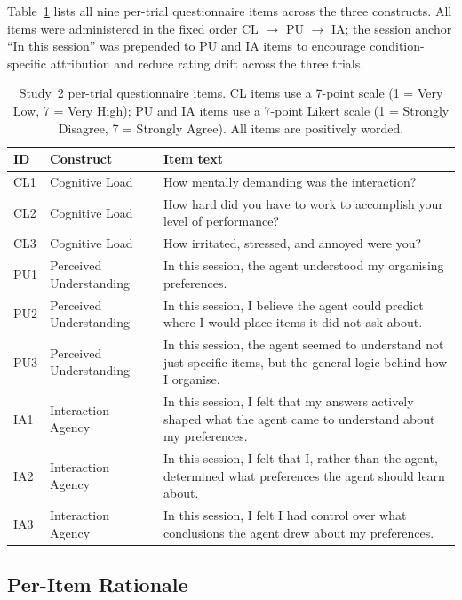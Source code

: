\documentclass[manuscript,review,anonymous]{acmart}
\begin{document}
Table~\ref{tab:questionnaire-items} lists all nine per-trial questionnaire items across the three constructs. All items were administered in the fixed order CL $\to$ PU $\to$ IA; the session anchor ``In this session'' was prepended to PU and IA items to encourage condition-specific attribution and reduce rating drift across the three trials.

\begin{table}[h]
\centering
\caption{Study~2 per-trial questionnaire items. CL items use a 7-point scale (1 = Very Low, 7 = Very High); PU and IA items use a 7-point Likert scale (1 = Strongly Disagree, 7 = Strongly Agree). All items are positively worded.}
\label{tab:questionnaire-items}
\small
\begin{tabularx}{\linewidth}{@{} l l X @{}}
\toprule
\textbf{ID} & \textbf{Construct} & \textbf{Item text} \\
\midrule
CL1 & Cognitive Load & How mentally demanding was the interaction? \\
CL2 & Cognitive Load & How hard did you have to work to accomplish your level of performance? \\
CL3 & Cognitive Load & How irritated, stressed, and annoyed were you? \\
\midrule
PU1 & Perceived Understanding & In this session, the agent understood my organising preferences. \\
PU2 & Perceived Understanding & In this session, I believe the agent could predict where I would place items it did not ask about. \\
PU3 & Perceived Understanding & In this session, the agent seemed to understand not just specific items, but the general logic behind how I organise. \\
\midrule
IA1 & Interaction Agency & In this session, I felt that my answers actively shaped what the agent came to understand about my preferences. \\
IA2 & Interaction Agency & In this session, I felt that I, rather than the agent, determined what preferences the agent should learn about. \\
IA3 & Interaction Agency & In this session, I felt I had control over what conclusions the agent drew about my preferences. \\
\bottomrule
\end{tabularx}
\end{table}

\subsection*{Per-Item Rationale}
\end{document}
